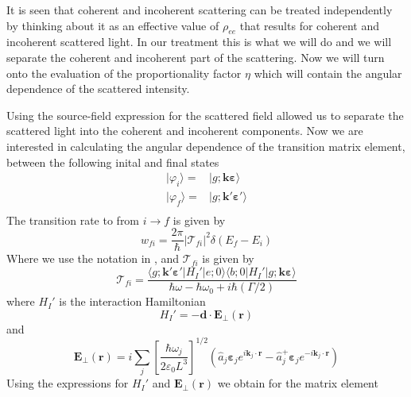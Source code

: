 \documentclass[11pt,letter]{article}
\newcommand{\bv}[1]{\ensuremath{\bm{#1}}}
\begin{document}
It is seen that coherent and incoherent scattering can be treated independently
by thinking about it as an effective value of $\rho_{ee}$ that results for
coherent and incoherent scattered light.  In our treatment this is what we will
do and we will separate the coherent and incoherent part of the scattering.
Now we will turn onto the evaluation of the proportionality factor $\eta$ which
will contain the angular dependence of the scattered intensity.  


Using the source-field expression for the scattered field allowed us to separate the scattered light into the coherent and incoherent components.  Now we are interested in calculating the angular dependence of the transition matrix element, between the following inital and final states
\begin{equation}
\begin{split}
    | \varphi_{i} \rangle = & | g ; \bv{k}\bv{\varepsilon} \rangle \\
    | \varphi_{f} \rangle = & | g ; \bv{k}'\bv{\varepsilon}' \rangle \\
\end{split}
\end{equation} 
The transition rate to from $i\rightarrow f$ is given by 
\begin{equation}
    \label{eq:transitionRate}
    w_{fi} = \frac{2\pi}{\hbar} | \mathcal{T}_{fi} |^{2} \delta(E_{f}-E_{i})
\end{equation}
Where we use the notation in \cite{cohen1998atom}, and $\mathcal{T}_{fi}$ is given by
\begin{equation}
    \mathcal{T}_{fi} = \frac{  
        \langle g; \bv{k}'\bv{\varepsilon}'| H_{I}' | e; 0 \rangle 
        \langle b; 0 | H_{I}' | g; \bv{k}\bv{\varepsilon} \rangle }
        { \hbar\omega - \hbar\omega_{0} + i\hbar (\Gamma/2 ) }
\end{equation} 
where $H_{I}'$ is the interaction Hamiltonian
\begin{equation}
    H_{I}' = -\bv{d} \cdot \bv{E}_{\perp} ( \bv{r} ) 
\end{equation}
and
\begin{equation}
    \bv{E}_{\perp}(\bv{r}) = i \sum_{j} 
        \left[ \frac{ \hbar \omega_{j} }{ 2\varepsilon_{0} L^{3}}  \right]^{1/2}
        \left( \hat{a}_{j}\bv{\varepsilon}_{j} e^{i\bv{k}_{j}\cdot\bv{r}} 
              - \hat{a}_{j}^{+}\bv{\varepsilon}_{j} e^{-i\bv{k}_{j}\cdot\bv{r}} 
        \right)
\end{equation}
Using the expressions for $H_{I}'$ and $\bv{E}_{\perp}(\bv{r})$ we obtain for the matrix element 
\end{document}
